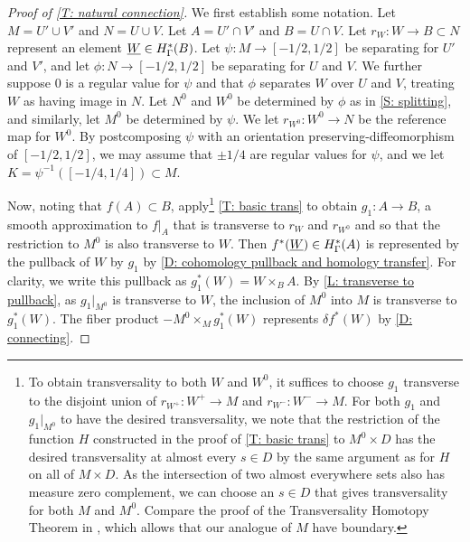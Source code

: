 \begin{proof}[Proof of \cref{T: natural connection}]
	We first establish some notation.
	Let $M = U' \cup V'$ and $N = U \cup V$.
	Let $A = U' \cap V'$ and $B = U \cap V$.
	Let $r_W \colon W \to B \subset N$ represent an element $\underline{W} \in H^*_\Gamma(B)$.
	Let $\psi \colon M \to [-1/2, 1/2]$ be separating for $U'$ and $V'$, and let $\phi \colon N \to [-1/2, 1/2]$ be separating for $U$ and $V$.
	We further suppose $0$ is a regular value for $\psi$ and that $\phi$ separates $W$ over $U$ and $V$, treating $W$ as having image in $N$.
	Let $N^0$ and $W^0$ be determined by $\phi$ as in \cref{S: splitting}, and similarly, let $M^0$ be determined by $\psi$.
	We let $r_{W^0} \colon W^0 \to N$ be the reference map for $W^0$.
	By postcomposing $\psi$ with an orientation preserving-diffeomorphism of $[-1/2, 1/2]$, we may assume that $\pm 1/4$ are regular values for $\psi$, and we let $K = \psi^{-1}([-1/4, 1/4]) \subset M$.

	Now, noting that $f(A) \subset B$, apply\footnote{To obtain transversality to both $W$ and $W^0$, it suffices to choose $g_1$ transverse to the disjoint union of $r_{W^+} \colon W^+ \to M$ and $r_{W^-} \colon W^- \to M$. For both $g_1$ and $g_1|_{M^0}$ to have the desired transversality, we note that the restriction of the function $H$ constructed in the proof of \cref{T: basic trans} to $M^0 \times D$ has the desired transversality at almost every $s \in D$ by the same argument as for $H$ on all of $M \times D$. As the intersection of two almost everywhere sets also has measure zero complement, we can choose an $s \in D$ that gives transversality for both $M$ and $M^0$. Compare the proof of the Transversality Homotopy Theorem in \cite{GuPo74}, which allows that our analogue of $M$ have boundary.} \cref{T: basic trans} to obtain $g_1 \colon A \to B$, a smooth approximation to $f|_A$ that is transverse to $r_W$ and $r_{W^0}$ and so that the restriction to $M^0$ is also transverse to $W$.
	Then $f^*(\underline{W}) \in H^*_\Gamma(A)$ is represented by the pullback of $W$ by $g_1$ by \cref{D: cohomology pullback and homology transfer}.
	For clarity, we write this pullback as $g_1^*(W) = W \times_B A$.
	By \cref{L: transverse to pullback}, as $g_1|_{M^0}$ is transverse to $W$, the inclusion of $M^0$ into $M$ is transverse to $g_1^*(W)$.
	The fiber product $ - M^0 \times_M g_1^*(W)$ represents $\delta f^* (W)$ by \cref{D: connecting}.

\end{proof}
